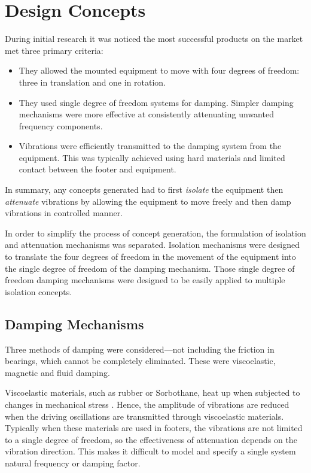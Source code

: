 \documentclass[11pt]{article}
\begin{document}
    
\section{Design Concepts}

During initial research it was noticed the most successful products on the 
market met three primary criteria:

\begin{itemize}
    \item They allowed the mounted equipment to move with four degrees of 
    freedom: three in translation and one in rotation.
    \item They used single degree of freedom systems for damping. Simpler 
    damping mechanisms were more effective at consistently attenuating 
    unwanted frequency components.
    \item Vibrations were efficiently transmitted to the damping system from 
    the equipment. This was typically achieved using hard materials and limited 
    contact between the footer and equipment.
\end{itemize}

In summary, any concepts generated had to first \emph{isolate} the equipment 
then \emph{attenuate} vibrations by allowing the equipment to move freely and 
then damp vibrations in controlled manner.

In order to simplify the process of concept generation, the formulation of 
isolation and attenuation mechanisms was separated. Isolation mechanisms were 
designed to translate the four degrees of freedom in the movement of the 
equipment into the single degree of freedom of the damping mechanism. Those 
single degree of freedom damping mechanisms were designed to be easily applied 
to multiple isolation concepts.

\subsection{Damping Mechanisms} \label{sec:damping_mechanisms}

Three methods of damping were considered---not including the friction in 
bearings, which cannot be completely eliminated. These were viscoelastic, 
magnetic and fluid damping.

Viscoelastic materials, such as rubber or Sorbothane\textregistered, heat up 
when subjected to changes in mechanical stress \cite{meyers2009mechanical}. 
Hence, the amplitude of vibrations are reduced when the driving oscillations 
are transmitted through viscoelastic materials. Typically when these materials 
are used in footers, the vibrations are not limited to a single degree of 
freedom, so the effectiveness of attenuation depends on the vibration 
direction. This makes it difficult to model and specify a single system natural 
frequency or damping factor.
\end{document}
